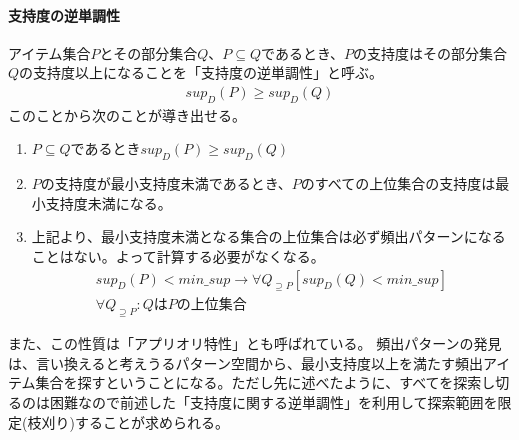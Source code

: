 \documentclass[dvipdfmx]{jsarticle}
\begin{document}
\paragraph{支持度の逆単調性}
アイテム集合$P$とその部分集合$Q$、$P \subseteq Q$であるとき、$P$の支持度はその部分集合$Q$の支持度以上になることを「支持度の逆単調性」と呼ぶ。
\begin{gather*}
  sup_{D}(P) \geq sup_{D}(Q)
\end{gather*}
このことから次のことが導き出せる。
\begin{enumerate}
  \item $P \subseteq Q$であるとき$sup_{D}(P) \geq sup_{D}(Q)$
  \item $P$の支持度が最小支持度未満であるとき、$P$のすべての上位集合の支持度は最小支持度未満になる。
  \item 上記より、最小支持度未満となる集合の上位集合は必ず頻出パターンになることはない。よって計算する必要がなくなる。
  \begin{gather*}
    sup_{D}(P) < min\_sup \to \forall Q_{\supseteq P}[sup_{D}(Q) < min\_sup]\\
    \forall Q_{\supseteq P}:QはPの上位集合
  \end{gather*}
\end{enumerate}
また、この性質は「アプリオリ特性」とも呼ばれている。
頻出パターンの発見は、言い換えると考えうるパターン空間から、最小支持度以上を満たす頻出アイテム集合を探すということになる。ただし先に述べたように、すべてを探索し切るのは困難なので前述した「支持度に関する逆単調性」を利用して探索範囲を限定(枝刈り)することが求められる。
\end{document}
